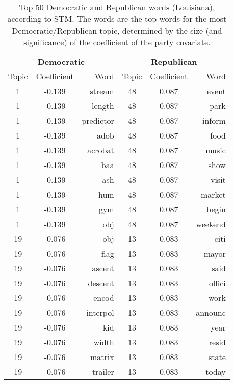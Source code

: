 \begin{table}[ht]
\centering
\caption{Top 50 Democratic and Republican words (Louisiana), according to STM. 
             The words are the top words for the most Democratic/Republican topic, determined
             by the size (and significance) of the coefficient of the party covariate.} 
\label{tabSTMLA}
\begingroup\footnotesize
\begin{tabular}{ccr|ccr}
  \toprule 
 \multicolumn{3}{c}{\textbf{Democratic}} & \multicolumn{3}{c}{\textbf{Republican}} \\
 \cmidrule(l){1-3} \cmidrule(l){4-6}
  Topic & Coefficient & Word & Topic & Coefficient & Word \\
 \midrule 
    1 & -0.139 & stream &   48 & 0.087 & event \\ 
     1 & -0.139 & length &   48 & 0.087 & park \\ 
     1 & -0.139 & predictor &   48 & 0.087 & inform \\ 
     1 & -0.139 & adob &   48 & 0.087 & food \\ 
     1 & -0.139 & acrobat &   48 & 0.087 & music \\ 
     1 & -0.139 & baa &   48 & 0.087 & show \\ 
     1 & -0.139 & ash &   48 & 0.087 & visit \\ 
     1 & -0.139 & hum &   48 & 0.087 & market \\ 
     1 & -0.139 & gym &   48 & 0.087 & begin \\ 
     1 & -0.139 & obj &   48 & 0.087 & weekend \\ 
   \cmidrule(l){1-3} \cmidrule(l){4-6}
  19 & -0.076 & obj &   13 & 0.083 & citi \\ 
    19 & -0.076 & flag &   13 & 0.083 & mayor \\ 
    19 & -0.076 & ascent &   13 & 0.083 & said \\ 
    19 & -0.076 & descent &   13 & 0.083 & offici \\ 
    19 & -0.076 & encod &   13 & 0.083 & work \\ 
    19 & -0.076 & interpol &   13 & 0.083 & announc \\ 
    19 & -0.076 & kid &   13 & 0.083 & year \\ 
    19 & -0.076 & width &   13 & 0.083 & resid \\ 
    19 & -0.076 & matrix &   13 & 0.083 & state \\ 
    19 & -0.076 & trailer &   13 & 0.083 & today \\ 

\end{tabular}
\end{table}
